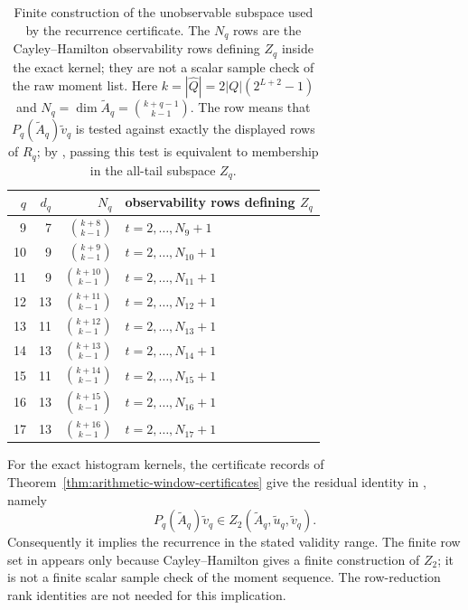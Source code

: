 \begin{table}[t]
\centering
\scriptsize
\setlength{\tabcolsep}{5pt}
\caption{Finite construction of the unobservable subspace used by the
recurrence certificate.  The \(N_q\) rows are the Cayley--Hamilton
observability rows defining \(Z_q\) inside the exact kernel; they are not a
scalar sample check of the raw moment list.
Here \(k=|\widehat Q|=2|Q|(2^{L+2}-1)\) and
\(N_q=\dim\widetilde A_q=\binom{k+q-1}{k-1}\).  The row means that
\(P_q(\widetilde A_q)\widetilde v_q\) is tested against exactly the displayed
rows of \(R_q\); by , passing
this test is equivalent to membership in the all-tail subspace \(Z_q\).}
\label{tab:appendix-residual-order-certificates}
\begin{tabular}{r r r l}
\toprule
\(q\) & \(d_q\) & \(N_q\) & observability rows defining \(Z_q\) \\
\midrule
9  & 7  & \(\binom{k+8}{k-1}\)  & \(t=2,\dots,N_9+1\)\\
10 & 9  & \(\binom{k+9}{k-1}\)  & \(t=2,\dots,N_{10}+1\)\\
11 & 9  & \(\binom{k+10}{k-1}\) & \(t=2,\dots,N_{11}+1\)\\
12 & 13 & \(\binom{k+11}{k-1}\) & \(t=2,\dots,N_{12}+1\)\\
13 & 11 & \(\binom{k+12}{k-1}\) & \(t=2,\dots,N_{13}+1\)\\
14 & 13 & \(\binom{k+13}{k-1}\) & \(t=2,\dots,N_{14}+1\)\\
15 & 11 & \(\binom{k+14}{k-1}\) & \(t=2,\dots,N_{15}+1\)\\
16 & 13 & \(\binom{k+15}{k-1}\) & \(t=2,\dots,N_{16}+1\)\\
17 & 13 & \(\binom{k+16}{k-1}\) & \(t=2,\dots,N_{17}+1\)\\
\bottomrule
\end{tabular}
\end{table}

\begin{proposition}
\label{prop:quotient-residual-equivalence}
For the exact histogram kernels, the certificate records of
Theorem~\ref{thm:arithmetic-window-certificates} give the residual identity in
, namely
\[
  P_q(\widetilde A_q)\widetilde v_q\in
  Z_2(\widetilde A_q,\widetilde u_q,\widetilde v_q).
\]
Consequently it implies the recurrence in the stated validity range.  The
finite row set in  appears only
because Cayley--Hamilton gives a finite construction of \(Z_2\); it is not a
finite scalar sample check of the moment sequence.
The row-reduction rank identities are not needed for this implication.
\end{proposition}

